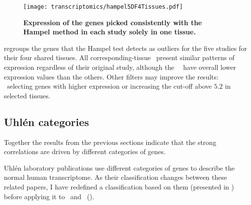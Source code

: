 \begin{figure}[!htbp]
    \texttt{[image: transcriptomics/hampel5DF4Tissues.pdf]}\centering
    \caption[Expression of the genes picked with Hampel method]{\label{fig:hampelExp}%
    \textbf{Expression of the genes picked consistently with the Hampel method
    in each study solely in one tissue.}}
\end{figure}

 regroups the genes that the Hampel test detects
as outliers for the five studies for their four shared tissues.
All corresponding-tissue \treps\ present similar patterns of expression
regardless of their original study,
although the \castle\ \treps\ have overall lower expression values than the others.
Other filters may improve the results:
\eg\ selecting genes with higher expression or
increasing the cut-off above $5.2$ in selected tissues.

\vspace{-4mm}
\subsection{Uhlén categories}\label{sub:UhlenGeneCat}
\vspace{-7mm}
Together the results from the previous sections indicate that
the strong correlations are driven by different categories of genes.

Uhlén laboratory publications 
use different categories of genes to describe the normal human transcriptome.
As their classification changes between these related papers,
I have redefined a classification based on them
(presented in )
before applying it to \setOne\ and \setTwo\ ().

